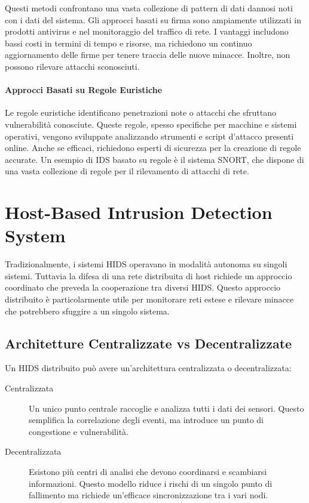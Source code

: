 Questi metodi confrontano una vasta collezione di pattern di dati dannosi noti con i dati del sistema. Gli approcci basati su firma sono ampiamente utilizzati in prodotti antivirus e nel monitoraggio del traffico di rete. I vantaggi includono bassi costi in termini di tempo e risorse, ma richiedono un continuo aggiornamento delle firme per tenere traccia delle nuove minacce. Inoltre, non possono rilevare attacchi sconosciuti.

\paragraph{Approcci Basati su Regole Euristiche}

Le regole euristiche identificano penetrazioni note o attacchi che sfruttano vulnerabilità conosciute. Queste regole, spesso specifiche per macchine e sistemi operativi, vengono sviluppate analizzando strumenti e script d'attacco presenti online. Anche se efficaci, richiedono esperti di sicurezza per la creazione di regole accurate. Un esempio di IDS basato su regole è il sistema SNORT, che dispone di una vasta collezione di regole per il rilevamento di attacchi di rete.

\section{Host-Based Intrusion Detection System}

Tradizionalmente, i sistemi HIDS operavano in modalità autonoma su singoli sistemi. Tuttavia la difesa di una rete distribuita di host richiede un approccio coordinato che preveda la cooperazione tra diversi HIDS. Questo approccio distribuito è particolarmente utile per monitorare reti estese e rilevare minacce che potrebbero sfuggire a un singolo sistema.

\subsection{Architetture Centralizzate vs Decentralizzate}

Un HIDS distribuito può avere un'architettura centralizzata o decentralizzata:

\begin{description}
    \item[Centralizzata] Un unico punto centrale raccoglie e analizza tutti i dati dei sensori. Questo semplifica la correlazione degli eventi, ma introduce un punto di congestione e vulnerabilità.
    
    \item[Decentralizzata] Esistono più centri di analisi che devono coordinarsi e scambiarsi informazioni. Questo modello riduce i rischi di un singolo punto di fallimento ma richiede un'efficace sincronizzazione tra i vari nodi.
\end{description}

